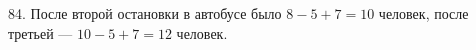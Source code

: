 84. После второй остановки в автобусе было $8-5+7=10$ человек, после третьей --- $10-5+7=12$ человек.\\
